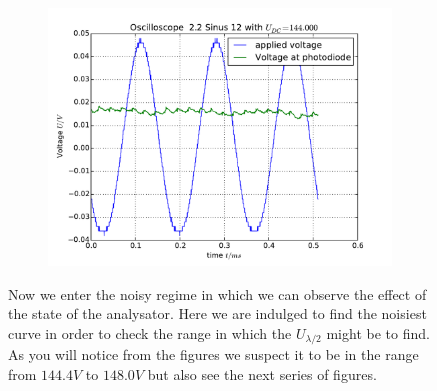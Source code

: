 \begin{figure}
\begin{subfigure}[b]{\picwidth}
        \caption{}
    \end{subfigure}
    \begin{subfigure}[b]{\picwidth}
        \includegraphics[width=\textwidth]{analysis/figures/22sinus12}
        \caption{}
    \end{subfigure}

    \caption{Now we enter the noisy regime in which we can 
        observe the effect of the state of the analysator. 
        Here we are indulged to find the noisiest curve in 
        order to check the range in which the $U_{\lambda / 2}$
        might be to find. As you will notice from the figures we
        suspect it to be in the range from $144.4V$ to $148.0V$
        but also see the next series of figures.}
    \label{fig:sinus2}
\end{figure}

